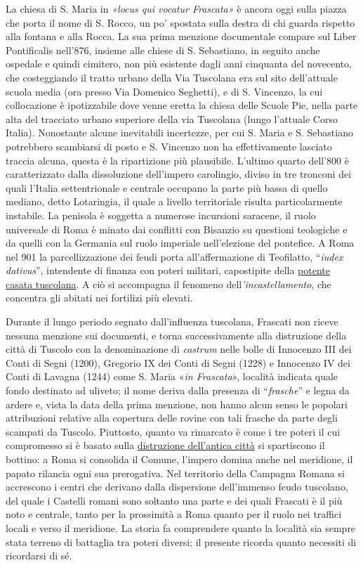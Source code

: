 \documentclass[
  letterpaper,
  DIV=11,
  numbers=noendperiod]{scrartcl}
\begin{document}
La chiesa di S. Maria in \emph{«locus qui vocatur Frascata»} è ancora
oggi sulla piazza che porta il nome di S. Rocco, un po' spostata sulla
destra di chi guarda rispetto alla fontana e alla Rocca. La sua prima
menzione documentale compare sul Liber Pontificalis nell'876, insieme
alle chiese di S. Sebastiano, in seguito anche ospedale e quindi
cimitero, non più esistente dagli anni cinquanta del novecento, che
costeggiando il tratto urbano della Via Tuscolana era sul sito
dell'attuale scuola media (ora presso Via Domenico Seghetti), e di S.
Vincenzo, la cui collocazione è ipotizzabile dove venne eretta la chiesa
delle Scuole Pie, nella parte alta del tracciato urbano superiore della
via Tuscolana (lungo l'attuale Corso Italia). Nonostante alcune
inevitabili incertezze, per cui S. Maria e S. Sebastiano potrebbero
scambiarsi di posto e S. Vincenzo non ha effettivamente lasciato traccia
alcuna, questa è la ripartizione più plausibile. L'ultimo quarto
dell'800 è caratterizzato dalla dissoluzione dell'impero carolingio,
diviso in tre tronconi dei quali l'Italia settentrionale e centrale
occupano la parte più bassa di quello mediano, detto Lotaringia, il
quale a livello territoriale risulta particolarmente instabile. La
penisola è soggetta a numerose incursioni saracene, il ruolo universale
di Roma è minato dai conflitti con Bisanzio su questioni teologiche e da
quelli con la Germania sul ruolo imperiale nell'elezione del pontefice.
A Roma nel 901 la parcellizzazione dei feudi porta all'affermazione di
Teofilatto, ``\emph{iudex dativus}'', intendente di finanza con poteri
militari, capostipite della
\href{2012-05-10-possedimenti-memorie-tuscolo-comandini.html}{potente
casata tuscolana}. A ciò si accompagna il fenomeno
dell\emph{'incastellamento}, che concentra gli abitati nei fortilizi più
elevati.

Durante il lungo periodo segnato dall'influenza tuscolana, Frascati non
riceve nessuna menzione sui documenti, e torna successivamente alla
distruzione della città di Tuscolo con la denominazione di
\emph{castrum} nelle bolle di Innocenzo III dei Conti di Segni (1200),
Gregorio IX dei Conti di Segni (1228) e Innocenzo IV dei Conti di
Lavagna (1244) come S. Maria «\emph{in Frascata}», località indicata
quale fondo destinato ad uliveto; il nome deriva dalla presenza di
``\emph{frasche}'' e legna da ardere e, vista la data della prima
menzione, non hanno alcun senso le popolari attribuzioni relative alla
copertura delle rovine con tali frasche da parte degli scampati da
Tuscolo. Piuttosto, quanto va rimarcato è come i tre poteri il cui
compromesso si è basato sulla
\href{2016-09-07-8-settembre-frascati-tuscolo-comandini.html}{distruzione
dell'antica città} si spartiscono il bottino: a Roma si consolida il
Comune, l'impero domina anche nel meridione, il papato rilancia ogni sua
prerogativa. Nel territorio della Campagna Romana si accrescono i centri
che derivano dalla dispersione dell'immenso feudo tuscolano, del quale i
Castelli romani sono soltanto una parte e dei quali Frascati è il più
noto e centrale, tanto per la prossimità a Roma quanto per il ruolo nei
traffici locali e verso il meridione. La storia fa comprendere quanto la
località sia sempre stata terreno di battaglia tra poteri diversi; il
presente ricorda quanto necessiti di ricordarsi di sé.
\end{document}
